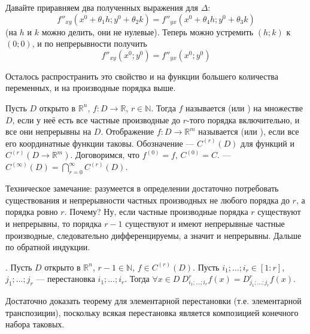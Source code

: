 \documentclass{article}
\begin{document}
\begin{itemize}
\begin{Proof}
            Давайте приравняем два полученных выражения для $\Delta$:
            $$
            f''_{xy}(x^0+\theta_1h;y^0+\theta_2k)=f''_{yx}(x^0+\theta_4h;y^0+\theta_3k)
            $$
            (на $h$ и $k$ можно делить, они не нулевые). Теперь можно устремить $(h;k)$ к $(0;0)$, и по непрерывности получить 
            $$
            f''_{xy}(x^0;y^0)=f''_{yx}(x^0;y^0)
            $$
        \end{Proof}
        \begin{Comment}
            Осталось распространить это свойство и на функции большего количества переменных, и на производные порядка выше.
        \end{Comment}
        \dfn Пусть $D$ открыто в $\mathbb R^n$, $f\colon D\to\mathbb R$, $r\in\mathbb N$. Тогда $f$ называется  (или ) на множестве $D$, если у неё есть все частные производные до $r$-того порядка включительно, и все они непрерывны на $D$.
        \dfn Отображение $f\colon D\to\mathbb R^m$ называется  (или ), если все его координатные функции таковы. Обозначение --- $C^{(r)}(D)$ для функций и $C^{(r)}(D\to\mathbb R^m)$.
        \dfn Договоримся, что $f^{(0)}=f$, $C^{(0)}=C$.
        \dfn {} --- $C^{(\infty)}(D)=\bigcap\limits_{r=0}^\infty C^{(r)}(D)$.
        \begin{Comment}
            Техническое замечание: разумеется в определении достаточно потребовать существования и непрерывности частных производных не любого порядка до $r$, а порядка ровно $r$. Почему? Ну, если частные производные порядка $r$ существуют и непрерывны, то порядка $r-1$ существуют и имеют непрерывные частные производные, следовательно дифференцируемы, а значит и непрерывны. Дальше по обратной индукции.
        \end{Comment}
        \thm {}. Пусть $D$ открыто в $\mathbb R^n$, $r-1\in\mathbb N$, $f\in C^{(r)}(D)$. Пусть $i_1;\ldots;i_r\in[1:r]$, $j_1;\ldots;j_r$ --- перестановка $i_1;\ldots;i_r$. Тогда $\forall x\in D~D^{r}_{i_1;\ldots;i_r}f(x)=D^{r}_{j_1;\ldots;j_r}f(x)$.
        \begin{Proof}
            Достаточно доказать теорему для элементарной перестановки (т.е. элементарной транспозиции), поскольку всякая перестановка является композицией конечного набора таковых.\\

\end{Proof}
\end{itemize}
\end{document}
